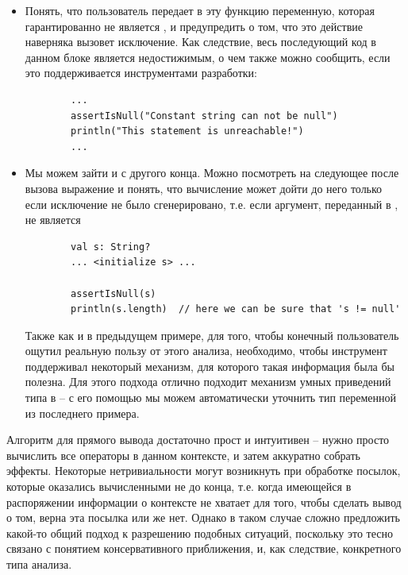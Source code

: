 \begin{itemize}
    \item Понять, что пользователь передает в эту функцию переменную, которая гарантированно не является , и предупредить о том, что это действие наверняка вызовет исключение. Как следствие, весь последующий код в данном блоке является недостижимым, о чем также можно сообщить, если это поддерживается инструментами разработки:

    \begin{verbatim}
        ...
        assertIsNull("Constant string can not be null")
        println("This statement is unreachable!")
        ...
    \end{verbatim}

    \item Мы можем зайти и с другого конца. Можно посмотреть на следующее после вызова выражение и понять, что вычисление может дойти до него только если исключение не было сгенерировано, т.е. если аргумент, переданный в , не является 

    \begin{verbatim}
        val s: String?
        ... <initialize s> ...

        assertIsNull(s)
        println(s.length)  // here we can be sure that 's != null'
    \end{verbatim}

    Также как и в предыдущем примере, для того, чтобы конечный пользователь ощутил реальную пользу от этого анализа, необходимо, чтобы инструмент поддерживал некоторый механизм, для которого такая информация была бы полезна. Для этого подхода отлично подходит механизм умных приведений типа в  -- с его помощью мы можем автоматически уточнить тип переменной  из последнего примера.
\end{itemize}

Алгоритм для прямого вывода достаточно прост и интуитивен -- нужно просто вычислить все операторы в данном контексте, и затем аккуратно собрать эффекты. Некоторые нетривиальности могут возникнуть при обработке посылок, которые оказались вычисленными не до конца, т.е. когда имеющейся в распоряжении информации о контексте не хватает для того, чтобы сделать вывод о том, верна эта посылка или же нет. Однако в таком случае сложно предложить какой-то общий подход к разрешению подобных ситуаций, поскольку это тесно связано с понятием консервативного приближения, и, как следствие, конкретного типа анализа.

